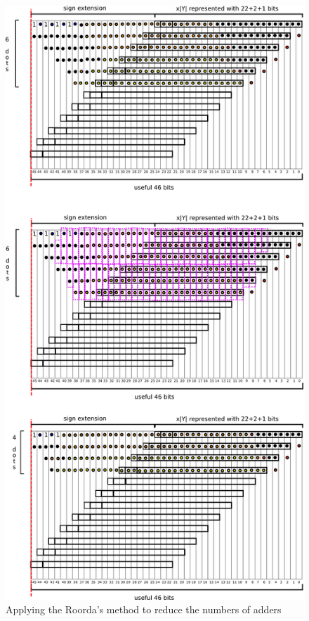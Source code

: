 \documentclass[a4paper]{article}
\begin{document}
	\begin{figure}[hbtp]
	\centering
	\includegraphics[width=.6\linewidth]{media/v1_FA_dadda_bindings_2.png}
	\caption{Applying the Roorda's method to reduce the numbers of adders}
	\label{fig:v1-bind2}
	\end{figure}
\end{document}
